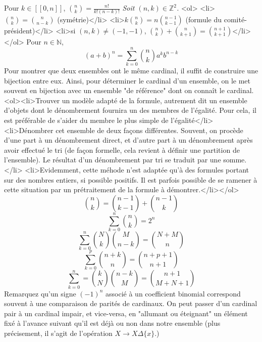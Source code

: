 \documentclass[11pt]{article}
\newcommand{\bb}[1]{\mathbb{#1}}
\newcommand{\N}{\bb{N}}
\newcommand{\Z}{\bb{Z}}
\begin{document}
\textit{  }
Pour $k \in [\![0, n]\!]$, $\binom{n}{k} = \frac{n!}{k!(n-k)!}$
\textit{ Soit $(n,k) \in \Z^2$. }
<ol> <li>$\binom{n}{k} = \binom{n}{n-k}$ (symétrie)</li> <li>$k\binom{n}{k} = n\binom{n-1}{k-1}$ (formule du comité-président)</li> <li>si $(n,k) \neq (-1, -1)$, $\binom{n}{k} + \binom{n}{k+1} = \binom{n+1}{k+1}$</li> </ol>
\textit{  }
Pour $n \in \N$, $$(a+b)^n = \sum_{k=0}^n\binom{n}{k}a^kb^{n-k}$$
\textit{  }
Pour montrer que deux ensembles ont le même cardinal, il suffit de construire une bijection entre eux. Ainsi, pour déterminer le cardinal d'un ensemble, on le met souvent en bijection avec un ensemble "de référence" dont on connaît le cardinal.
\textit{  }
<ol><li>Trouver un modèle adapté de la formule, autrement dit un ensemble d'objets dont le dénombrement fournira un des membres de l'égalité. Pour cela, il est préférable de s'aider du membre le plus simple de l'égalité</li> <li>Dénombrer cet ensemble de deux façons différentes. Souvent, on procède d'une part à un dénombrement direct, et d'autre part à un dénombrement après avoir effectué le tri (de façon formelle, cela revient à définir une partition de l'ensemble). Le résultat d'un dénombrement par tri se traduit par une somme.</li> <li>Evidemment, cette méhode n'est adaptée qu'à des formules portant sur des nombres entiers, si possible positifs. Il est parfois possible de se ramener à cette situation par un prétraitement de la formule à démontrer.</li></ol>
\textit{  }
$$\binom{n}{k} = \binom{n-1}{k-1} + \binom{n-1}{k}$$
\textit{  }
$$\sum_{k=0}^n \binom{n}{k} = 2^n$$
\textit{  }
$$\sum_{k=0}^n\binom{N}{k}\binom{M}{n-k} = \binom{N+M}{n}$$
\textit{  }
$$\sum_{k=0}^p\binom{n+k}{n} = \binom{n+p+1}{n+1}$$
\textit{  }
$$\sum_{k=0}^n = \binom{k}{N}\binom{n-k}{M} = \binom{n+1}{M+N+1}$$
\textit{  }
Remarquez qu'un signe $(-1)^n$ associé à un coefficient binomial correspond souvent à une comparaison de parités de cardinaux. On peut passer d'un cardinal pair à un cardinal impair, et vice-versa, en "allumant ou éteignant" un élément fixé à l'avance suivant qu'il est déjà ou non dans notre ensemble (plus précisement, il s'agit de l'opération $X \rightarrow X \Delta \{x\}$.)
\end{document}
